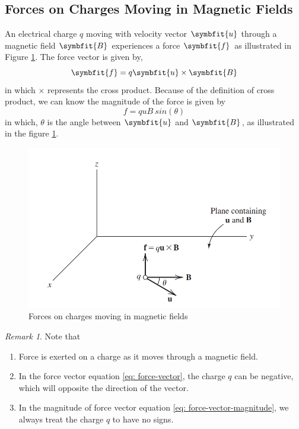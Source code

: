 \documentclass[math,code]{amznotes}
\theoremstyle{remark}
\newtheorem*{remark}{Remark}
\begin{document}
\subsection{Forces on Charges Moving in Magnetic Fields}
An electrical charge $q$ moving with velocity vector $\symbfit{u}$ through a magnetic field $\symbfit{B}$ experiences a force $\symbfit{f}$ as illustrated in Figure \ref{fig:forces-on-moving-charges-in-magnetic-fields}. The force vector is given by,
\begin{equation} \label{eq: force-vector}
    \symbfit{f} = q\symbfit{u} \times \symbfit{B}
\end{equation}
in which $\times$ represents the cross product. Because of the definition of cross product, we can know the magnitude of the force is given by
\begin{equation} \label{eq: force-vector-magnitude}
    f=quB~sin(\theta)
\end{equation}
in which, $\theta$ is the angle between $\symbfit{u}$ and $\symbfit{B}$, as illustrated in the figure \ref{fig:forces-on-moving-charges-in-magnetic-fields}.
\begin{figure}[H]
    \centering
    \includegraphics[width=0.5\linewidth]{images/forces-on-moving-charges-in-magnetic-fields.png}
    \caption{Forces on charges moving in magnetic fields}
    \label{fig:forces-on-moving-charges-in-magnetic-fields}
\end{figure}
\begin{notebox}
    \begin{remark}
    Note that
    \begin{enumerate}
        \item Force is exerted on a charge as it moves through a magnetic field.
        \item In the force vector equation \eqref{eq: force-vector}, the charge $q$ can be negative, which will opposite the direction of the vector.
        \item In the magnitude of force vector equation \eqref{eq: force-vector-magnitude}, we always treat the charge $q$ to have no signs.
    \end{enumerate}
        
    \end{remark}
\end{notebox}
\end{document}
